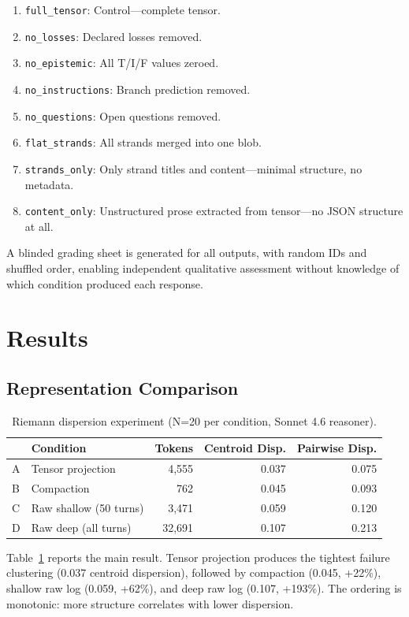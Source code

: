\documentclass[11pt]{article}
\begin{document}
\begin{enumerate}
\item \texttt{full\_tensor}: Control---complete tensor.
\item \texttt{no\_losses}: Declared losses removed.
\item \texttt{no\_epistemic}: All T/I/F values zeroed.
\item \texttt{no\_instructions}: Branch prediction removed.
\item \texttt{no\_questions}: Open questions removed.
\item \texttt{flat\_strands}: All strands merged into one blob.
\item \texttt{strands\_only}: Only strand titles and content---minimal
  structure, no metadata.
\item \texttt{content\_only}: Unstructured prose extracted from
  tensor---no JSON structure at all.
\end{enumerate}

A blinded grading sheet is generated for all outputs, with random IDs
and shuffled order, enabling independent qualitative assessment without
knowledge of which condition produced each response.

\section{Results}

\subsection{Representation Comparison}

\begin{table}[t]
\centering
\caption{Riemann dispersion experiment (N=20 per condition, Sonnet 4.6 reasoner).}
\label{tab:riemann}
\begin{tabular}{llrrr}
\toprule
& Condition & Tokens & Centroid Disp. & Pairwise Disp. \\
\midrule
A & Tensor projection & 4,555 & 0.037 & 0.075 \\
B & Compaction & 762 & 0.045 & 0.093 \\
C & Raw shallow (50 turns) & 3,471 & 0.059 & 0.120 \\
D & Raw deep (all turns) & 32,691 & 0.107 & 0.213 \\
\bottomrule
\end{tabular}
\end{table}

Table~\ref{tab:riemann} reports the main result. Tensor projection
produces the tightest failure clustering (0.037 centroid dispersion),
followed by compaction (0.045, +22\%), shallow raw log (0.059, +62\%),
and deep raw log (0.107, +193\%). The ordering is monotonic: more
structure correlates with lower dispersion.
\end{document}

